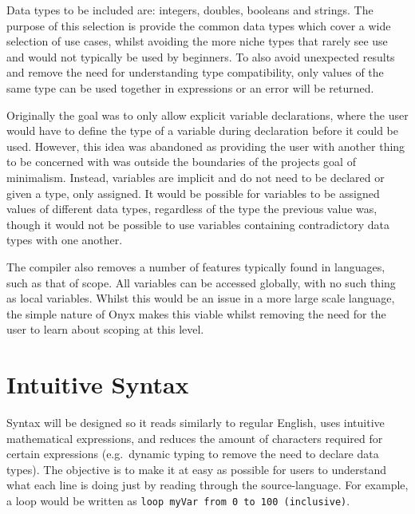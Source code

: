 \documentclass[
]{report}
\begin{document}
Data types to be included are: integers, doubles, booleans and strings.
The purpose of this selection is provide the common data types which
cover a wide selection of use cases, whilst avoiding the more niche
types that rarely see use and would not typically be used by beginners.
To also avoid unexpected results and remove the need for understanding
type compatibility, only values of the same type can be used together in
\glspl{expression} or an error will be returned.

Originally the goal was to only allow explicit variable declarations,
where the user would have to define the type of a variable during
declaration before it could be used. However, this idea was abandoned as
providing the user with another thing to be concerned with was outside
the boundaries of the projects goal of minimalism. Instead, variables are
implicit and do not need to be declared or given a type, only assigned.
It would be possible for variables to be assigned values of different
data types, regardless of the type the previous value was, though it
would not be possible to use variables containing contradictory data
types with one another.

The compiler also removes a number of features typically found in
languages, such as that of scope. All variables can be accessed
globally, with no such thing as local variables. Whilst this would be an
issue in a more large scale language, the simple nature of Onyx makes
this viable whilst removing the need for the user to learn about scoping
at this level.

\section{Intuitive Syntax}
Syntax will be designed so it reads similarly to regular English, uses
intuitive mathematical \glspl{expression}, and reduces the amount of characters
required for certain \glspl{expression} (e.g.~dynamic typing to remove the need
to declare data types). The objective is to make it at easy as possible
for users to understand what each line is doing just by reading through
the \gls{source-language}. For example, a loop would be written as
\texttt{loop\ myVar\ from\ 0\ to\ 100\ (inclusive)}.
\end{document}
